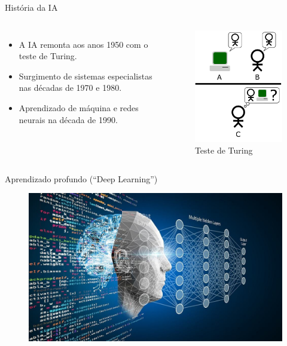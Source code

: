 \documentclass{beamer}
\begin{document}
\begin{frame}{História da IA}
\begin{columns}
\begin{itemize}\itemsep=4mm
\item A IA remonta aos anos 1950 com o teste de Turing.

\item Surgimento de sistemas especialistas nas décadas de 1970 e 1980.
\item Aprendizado de máquina e redes neurais na década de 1990.
\end{itemize}

\begin{figure}
    \centering
    \includegraphics[scale=0.45]{figuras/Turing_Test.png}
    \caption{\tiny{Teste de Turing}}
\end{figure}
\end{columns}
\end{frame}

\begin{frame}{Aprendizado profundo (``Deep Learning'')}
\begin{figure}
    \centering
    \includegraphics[scale=0.35]{figuras/deep-learning.jpg}
\end{figure}
\end{frame}
\end{document}
